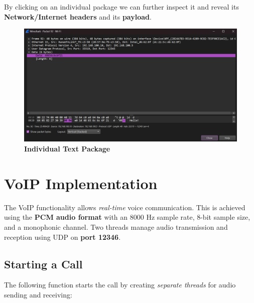 \documentclass[a4paper,12pt]{article}
\begin{document}
\vspace{0.5cm}
By clicking on an individual package we can further inspect it and reveal its \textbf{Network/Internet headers} and its \textbf{payload}.
\begin{figure}[H]
    \centering
    \includegraphics[width=1\linewidth]{assets/Text Package.png}
    \caption{\textbf{Individual Text Package}}
    \label{fig:enter-label}
\end{figure}

\section{VoIP Implementation}

The VoIP functionality allows \textit{real-time} voice communication. This is achieved using the \textbf{PCM audio format} with an 8000 Hz sample rate, 8-bit sample size, and a monophonic channel. Two threads manage audio transmission and reception using UDP on \textbf{port 12346}.

\subsection{Starting a Call}
The following function starts the call by creating \textit{separate threads} for audio sending and receiving:
\end{document}
